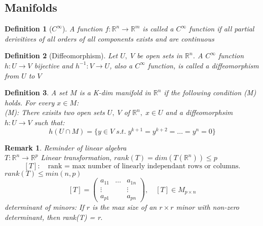 \documentclass[11pt]{article}
\def\RR{\mathbb{R}}
\newtheorem{definition}{Definition}[section]
\newtheorem*{remark}{Remark}
\begin{document}
\subsection{Manifolds}

\begin{definition}[$C^{\infty}$]
A function $f:\RR^n \rightarrow \RR^m$ is called a $C^{\infty}$ function if all partial derivitives of all orders of all components exists and are continuous
\end{definition}

\begin{definition}[Diffeomorphism]
Let $U, \; V$ be open sets in $\RR^n$. A $C^{\infty}$ function $h:U\rightarrow V$ bijective and $h^{-1}:V \rightarrow U$, also a $C^{\infty}$ function, is called a diffeomorphism from $U$ to $V$
\end{definition}

\begin{definition}
A set $M$ is a K-dim manifold in $\RR^n$ if the following condition (M) holds. For every $x \in M$:\\
(M): There exisits two open sets $U, \; V$ of $\RR^n, \; x \in U$ and a diffeomorphsim $h:U \rightarrow V$ such that:
\[ h(U \cap M) = \{ y \in V \; s.t. \;y^{k+1} = y^{k+2} = \dots = y^{n} = 0\} \]
\end{definition}  

\begin{remark} \textmd{Reminder of linear algebra}\\
$T:\RR^n \rightarrow \RR^p$ Linear transformation, $rank(T) = dim(T(\RR^n)) \leq p$\\
\[[T]: \quad \text{rank = max number of linearly independant rows or columns.}\]
$rank(T) \leq min(n,p)$
\[[T] = \begin{pmatrix}
a_{11} & \dots & a_{1n}\\
\vdots & & \vdots\\
a_{p1} & & a_{pn} \end{pmatrix}, \quad [T] \in M_{p \times n} \]
determinant of minors: If $r$ is the max size of an $r \times r$ minor with non-zero determinant, then rank(T) = r.
\end{remark}
\end{document}
